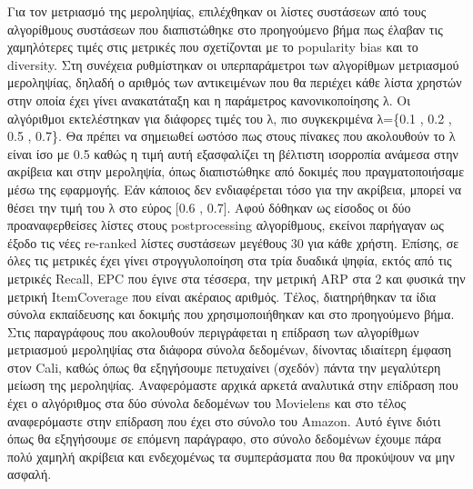   Για τον μετριασμό της μεροληψίας, επιλέχθηκαν οι λίστες συστάσεων από τους αλγορίθμους συστάσεων που διαπιστώθηκε στο προηγούμενο βήμα πως έλαβαν τις χαμηλότερες τιμές στις μετρικές που σχετίζονται με το popularity bias και το diversity. Στη συνέχεια ρυθμίστηκαν οι υπερπαράμετροι των αλγορίθμων μετριασμού μεροληψίας, δηλαδή ο αριθμός των αντικειμένων που θα περιέχει κάθε λίστα χρηστών στην οποία έχει γίνει ανακατάταξη και η παράμετρος κανονικοποίησης λ. Οι αλγόριθμοι εκτελέστηκαν για διάφορες τιμές του λ, πιο συγκεκριμένα λ=\{0.1 , 0.2 ,  0.5 , 0.7\}. Θα πρέπει να σημειωθεί ωστόσο πως στους πίνακες που ακολουθούν το λ είναι ίσο με 0.5 καθώς η τιμή αυτή εξασφαλίζει τη βέλτιστη ισορροπία ανάμεσα στην ακρίβεια και στην μεροληψία, όπως διαπιστώθηκε από δοκιμές που πραγματοποιήσαμε μέσω της εφαρμογής. Εάν κάποιος δεν ενδιαφέρεται τόσο για την ακρίβεια, μπορεί να θέσει την τιμή του λ στο εύρος [0.6 , 0.7]. Αφού δόθηκαν ως είσοδος οι δύο προαναφερθείσες λίστες στους postprocessing αλγορίθμους, εκείνοι παρήγαγαν ως έξοδο τις νέες re-ranked λίστες συστάσεων μεγέθους 30 για κάθε χρήστη.  Επίσης, σε όλες τις μετρικές έχει γίνει στρογγυλοποίηση στα τρία δυαδικά ψηφία, εκτός από τις μετρικές Recall, EPC που έγινε στα τέσσερα, την μετρική ARP στα 2 και φυσικά την μετρική ItemCoverage που είναι ακέραιος αριθμός. 
Τέλος, διατηρήθηκαν τα ίδια σύνολα εκπαίδευσης και δοκιμής που χρησιμοποιήθηκαν και στο προηγούμενο βήμα. Στις παραγράφους που ακολουθούν περιγράφεται η επίδραση των αλγορίθμων μετριασμού μεροληψίας στα διάφορα σύνολα δεδομένων, δίνοντας ιδιαίτερη έμφαση στον Cali, καθώς όπως θα εξηγήσουμε πετυχαίνει (σχεδόν) πάντα την μεγαλύτερη μείωση της μεροληψίας. Αναφερόμαστε αρχικά αρκετά αναλυτικά στην επίδραση που έχει ο αλγόριθμος στα δύο σύνολα δεδομένων του Movielens και στο τέλος αναφερόμαστε στην επίδραση που έχει στο σύνολο του Amazon. Αυτό έγινε διότι όπως θα εξηγήσουμε σε επόμενη παράγραφο, στο σύνολο δεδομένων έχουμε πάρα πολύ χαμηλή ακρίβεια και ενδεχομένως τα συμπεράσματα που θα προκύψουν να μην ασφαλή.\\

